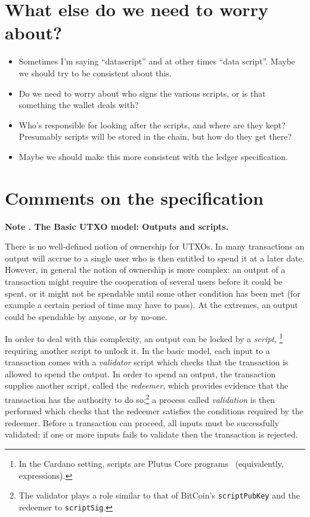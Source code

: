 \documentclass[a4paper]{article}
\newcounter{note}
\newcommand{\note}[1]{
  \bigskip
  \refstepcounter{note}
  \noindent\textbf{Note \thenote. #1}
}
\renewcommand{\i}{\textit}  %
\begin{document}
\section{What else do we need to worry about?}
\begin{itemize}

\item Sometimes I'm saying ``datascript'' and at other times ``data script''.
  Maybe we should try to be consistent about this.
  
\item Do we need to worry about who signs the various scripts, or is that
  something the wallet deals with?

\item Who's responsible for looking after the scripts, and where are they kept?
  Presumably scripts will be stored in the chain, but how do they get there?

\item Maybe we should make this more consistent with the ledger specification.
\end{itemize}
  
\appendix
\section{Comments on the specification}
\label{appendix:comments}

\note{The Basic UTXO model: Outputs and scripts.}
\label{note:basic-utxo}
There is no well-defined notion of ownership for UTXOs.  In many
transactions an output will accrue to a single user who is then
entitled to spend it at a later date.  However, in general the notion
of ownership is more complex: an output of a transaction might require
the cooperation of several users before it could be spent, or it might
not be spendable until some other condition has been met (for example
a certain period of time may have to pass).  At the extremes, an
output could be spendable by anyone, or by no-one.

In order to deal with this complexity, an output can be locked by a
\textit{script},%
\footnote{In the Cardano setting, scripts are Plutus Core
  programs~\citep{Plutus-Core-spec} (equivalently, expressions).  }
requiring another script to unlock it.  In the basic model, each input
to a transaction comes with a \i{validator} script which checks that
the transaction is allowed to spend the output. In order to spend an
output, the transaction supplies another script, called the
\i{redeemer}, which provides evidence that the transaction has the
authority to do so;\footnote{The validator plays a role similar to
  that of BitCoin's \texttt{scriptPubKey} and the redeemer to
  \texttt{scriptSig}.  } a process called \i{validation} is then
performed which checks that the redeemer satisfies the conditions
required by the redeemer. Before a transaction can proceed, all inputs
must be successfully validated: if one or more inputs fails to
validate then the transaction is rejected.
\end{document}
